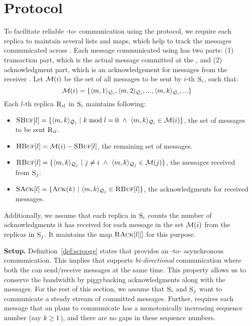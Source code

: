\section{\Shadow{} Protocol}
To facilitate reliable \RSM{}-to-\RSM{} communication using the \Scrooge{} protocol, 
we require each replica to maintain several lists and maps, which
help to track the messages communicated across .
Each message communicated using \Scrooge{} has two parts: 
(1) transaction part, which is the actual message committed at the \RSM{}, and 
(2) acknowledgment part, which is an acknowledgement for messages from the receiver \RSM{}. 
Let $\mathcal{M}(i)$ be the set of all messages to be sent by $i$-th \RSM{} $\textsc{S}_{i}$, such that:
\begin{equation*}
\mathcal{M}(i) = \{\langle m, 1\rangle_{\mathcal{Q}_{i}},  \langle m, 2\rangle_{\mathcal{Q}_{i}}, ... , \langle m, k\rangle_{\mathcal{Q}_{i}}, ... \} 
\end{equation*}
Each $l$-th replica $\textsc{R}_{{i}{l}}$ in \RSM{} $\textsc{S}_{i}$ maintains following:

\begin{itemize}[wide]
\item $\textsc{SBuf}[{l}] = \{\langle m, k\rangle_{\mathcal{Q}_{i}} ~|~ k \bmod l = 0 ~\wedge ~\langle m, k\rangle_{\mathcal{Q}_{i}} \in \mathcal{M}(i) \}$, the set of messages to be sent $\textsc{R}_{{i}{l}}$.

\item $\textsc{HBuf}[{l}] = \mathcal{M}(i) - \textsc{SBuf}[{l}]$, the remaining set of messages.

\item $\textsc{RBuf}[{l}] = \{\langle m, k\rangle_{\mathcal{Q}_{j}} ~|~ j \neq i ~\wedge ~\langle m, k\rangle_{\mathcal{Q}_{j}} \in \mathcal{M}(j) \}$, the messages received from \RSM{} $\textsc{S}_{j}$.

\item $\textsc{SAck}[{l}] = \{\textsc{Ack}(k) ~|~ \langle m, k\rangle_{\mathcal{Q}_{j}} \in \textsc{RBuf}[{l}] \}$, the acknowledgments for received messages.

\end{itemize}
%
Additionally, we assume that each replica in \RSM{} $\textsc{S}_{i}$ 
counts the number of acknowledgments it has received for 
each message in the set $\mathcal{M}(i)$ from the replicas in \RSM{} $\textsc{S}_{j}$.
It maintains the map $\textsc{RAck}[{l}][{}]$ for this purpose. 


{\bf Setup.}
Definition~\ref{def:scrooge} states that \Scrooge{} provides an \RSM{}-to-\RSM{} asynchronous communication.
This implies that \Scrooge{} supports {\em bi-directional} communication where both the  can send/receive 
messages at the same time.
This property allows us to conserve the bandwidth by piggybacking acknowledgments along with the messages.
For the rest of this section, we assume that  $\textsc{S}_{i}$ and $\textsc{S}_{j}$ want to communicate a 
steady stream of committed messages.
Further, \Scrooge{} requires each message that an \RSM{} plans to communicate has 
a monotonically increasing sequence number (say $k \ge 1$), and there are no gaps in these sequence numbers.


